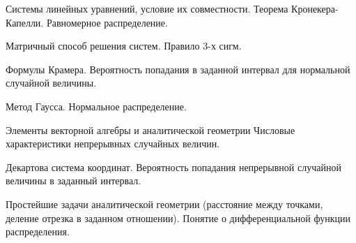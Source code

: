 \documentclass[
	14pt,
	a4paper,
	]
	{scrartcl}
\begin{document}
\newpage


\shapk
{}
\setcounter{zad}{0}

\vfill
\z 	Системы линейных уравнений, условие их совместности. Теорема Кронекера-Капелли.
 \vfill
\z 	Равномерное распределение.
 \vfill

\vfill

\newpage


\shapk
{}
\setcounter{zad}{0}

\vfill
\z 	Матричный способ решения систем.
 \vfill
\z 	Правило 3-х сигм.
 \vfill

\vfill

\newpage


\shapk
{}
\setcounter{zad}{0}

\vfill
\z 	Формулы Крамера. 
 \vfill
\z 	Вероятность попадания в заданной интервал для нормальной случайной величины.
 \vfill

\vfill

\newpage


\shapk
{}
\setcounter{zad}{0}

\vfill
\z 	Метод Гаусса.
 \vfill
\z 	Нормальное распределение.
 \vfill

\vfill

\newpage


\shapk
{}
\setcounter{zad}{0}

\vfill
\z 	Элементы векторной алгебры и аналитической геометрии
 \vfill
\z 	Числовые характеристики непрерывных случайных величин.
 \vfill

\vfill

\newpage


\shapk
{}
\setcounter{zad}{0}

\vfill
\z 	Декартова система координат.
 \vfill
\z 	Вероятность попадания непрерывной случайной величины в заданный интервал.
 \vfill

\vfill

\newpage


\shapk
{}
\setcounter{zad}{0}

\vfill
\z 	Простейшие задачи аналитической геометрии (расстояние между точками, деление отрезка в заданном отношении).
 \vfill
\z 	Понятие о дифференциальной функции распределения.
 \vfill

\vfill

\newpage


\shapk
{}
\setcounter{zad}{0}
\end{document}
